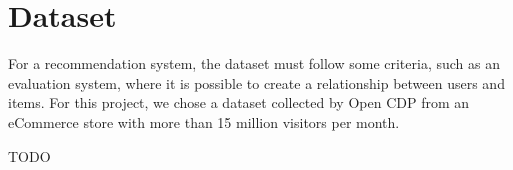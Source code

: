 \section{Dataset}
\label{dataset}

For a recommendation system, the dataset must follow some criteria, such as an evaluation system, where it is possible to create a relationship between users and items.
For this project, we chose a dataset collected by Open CDP from an eCommerce store with more than 15 million visitors per month.

TODO